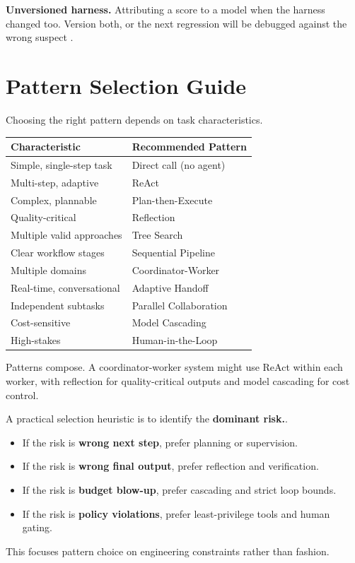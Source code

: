 \textbf{Unversioned harness.} Attributing a score to a model when the harness
changed too. Version both, or the next regression will be debugged against the
wrong suspect \cite{modelharness2026}.

\section{Pattern Selection Guide}

Choosing the right pattern depends on task characteristics.

\begin{center}
\begin{tabular}{ll}
\toprule
Characteristic & Recommended Pattern \\
\midrule
Simple, single-step task & Direct call (no agent) \\
Multi-step, adaptive & ReAct \\
Complex, plannable & Plan-then-Execute \\
Quality-critical & Reflection \\
Multiple valid approaches & Tree Search \\
Clear workflow stages & Sequential Pipeline \\
Multiple domains & Coordinator-Worker \\
Real-time, conversational & Adaptive Handoff \\
Independent subtasks & Parallel Collaboration \\
Cost-sensitive & Model Cascading \\
High-stakes & Human-in-the-Loop \\
\bottomrule
\end{tabular}
\end{center}

Patterns compose. A coordinator-worker system might use ReAct within each worker, with reflection for quality-critical outputs and model cascading for cost control.

A practical selection heuristic is to identify the \textbf{dominant risk.}.
\begin{itemize}
\item If the risk is \textbf{wrong next step}, prefer planning or supervision.
\item If the risk is \textbf{wrong final output}, prefer reflection and verification.
\item If the risk is \textbf{budget blow-up}, prefer cascading and strict loop bounds.
\item If the risk is \textbf{policy violations}, prefer least-privilege tools and human gating.
\end{itemize}
This focuses pattern choice on engineering constraints rather than fashion.

